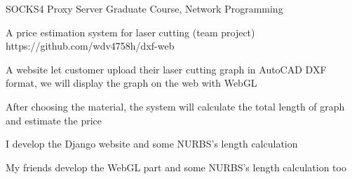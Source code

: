 \begin{cvopensources}
  \cvopensource
    {SOCKS4 Proxy Server}   %
    {Graduate Course, Network Programming}  %
    {}
    {}

  \cvopensource
    {A price estimation system for laser cutting (team project)}   %
    {}  %
    {https://github.com/wdv4758h/dxf-web}
    {
      \begin{cvitems}   %
        \item {A website let customer upload their laser cutting graph in AutoCAD DXF format, we will display the graph on the web with WebGL}
        \item {After choosing the material, the system will calculate the total length of graph and estimate the price}
        \item {I develop the Django website and some NURBS's length calculation}
        \item {My friends develop the WebGL part and some NURBS's length calculation too}
      \end{cvitems}
    }

\end{cvopensources}
